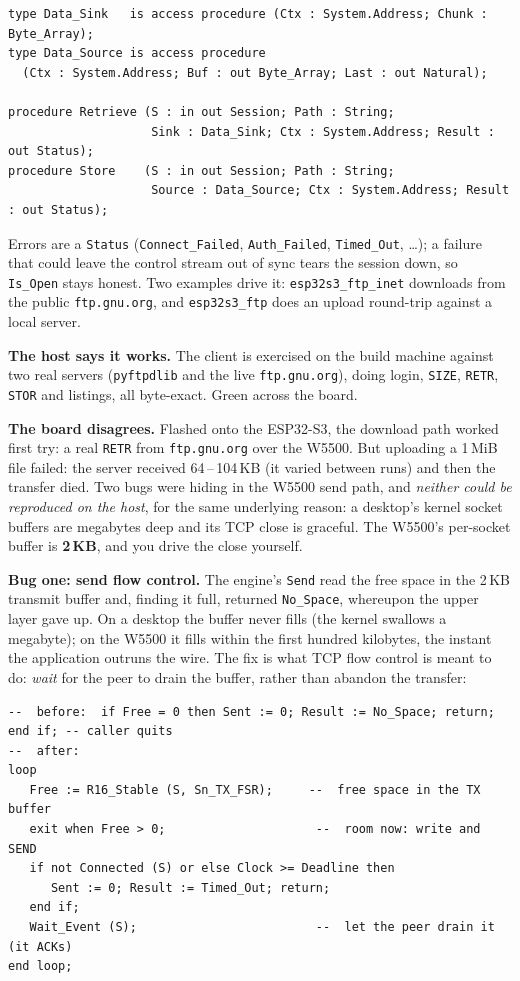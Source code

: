 \begin{lstlisting}
type Data_Sink   is access procedure (Ctx : System.Address; Chunk : Byte_Array);
type Data_Source is access procedure
  (Ctx : System.Address; Buf : out Byte_Array; Last : out Natural);

procedure Retrieve (S : in out Session; Path : String;
                    Sink : Data_Sink; Ctx : System.Address; Result : out Status);
procedure Store    (S : in out Session; Path : String;
                    Source : Data_Source; Ctx : System.Address; Result : out Status);
\end{lstlisting}

Errors are a \texttt{Status} (\texttt{Connect\_Failed}, \texttt{Auth\_Failed},
\texttt{Timed\_Out}, \dots); a failure that could leave the control stream out of
sync tears the session down, so \texttt{Is\_Open} stays honest. Two examples drive
it: \texttt{esp32s3\_ftp\_inet} downloads from the public \texttt{ftp.gnu.org}, and
\texttt{esp32s3\_ftp} does an upload round-trip against a local server.

\textbf{The host says it works.} The client is exercised on the build machine
against two real servers (\texttt{pyftpdlib} and the live \texttt{ftp.gnu.org}),
doing login, \texttt{SIZE}, \texttt{RETR}, \texttt{STOR} and listings, all
byte-exact. Green across the board.

\textbf{The board disagrees.} Flashed onto the ESP32-S3, the download path worked
first try: a real \texttt{RETR} from \texttt{ftp.gnu.org} over the W5500. But
uploading a 1\,MiB file failed: the server received 64\,--\,104\,KB (it varied
between runs) and then the transfer died. Two bugs were hiding in the W5500 send
path, and \emph{neither could be reproduced on the host}, for the same underlying
reason: a desktop's kernel socket buffers are megabytes deep and its TCP close is
graceful. The W5500's per-socket buffer is \textbf{2\,KB}, and you drive the close
yourself.

\textbf{Bug one: send flow control.} The engine's \texttt{Send} read the free
space in the 2\,KB transmit buffer and, finding it full, returned
\texttt{No\_Space}, whereupon the upper layer gave up. On a desktop the buffer
never fills (the kernel swallows a megabyte); on the W5500 it fills within the
first hundred kilobytes, the instant the application outruns the wire. The fix is
what TCP flow control is meant to do: \emph{wait} for the peer to drain the
buffer, rather than abandon the transfer:

\begin{lstlisting}
--  before:  if Free = 0 then Sent := 0; Result := No_Space; return; end if; -- caller quits
--  after:
loop
   Free := R16_Stable (S, Sn_TX_FSR);     --  free space in the TX buffer
   exit when Free > 0;                     --  room now: write and SEND
   if not Connected (S) or else Clock >= Deadline then
      Sent := 0; Result := Timed_Out; return;
   end if;
   Wait_Event (S);                         --  let the peer drain it (it ACKs)
end loop;
\end{lstlisting}

